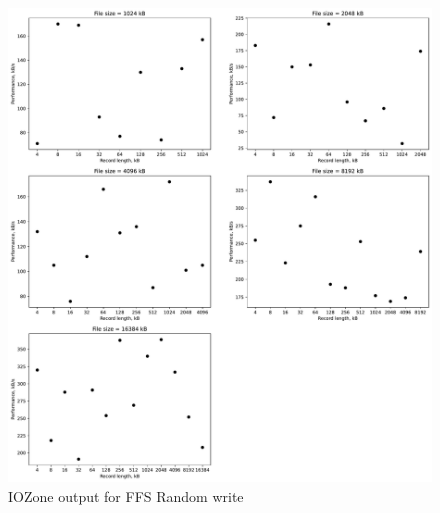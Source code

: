 \begin{figure}[!htb]
	\label{fig:app_bench_ffs_rnd_read}
	\begin{center}
		\includegraphics[width=1.0\textwidth]{figures/benchmarking/ffs/Random write.pdf}
	\end{center}
	\caption{IOZone output for FFS Random write}
\end{figure}

